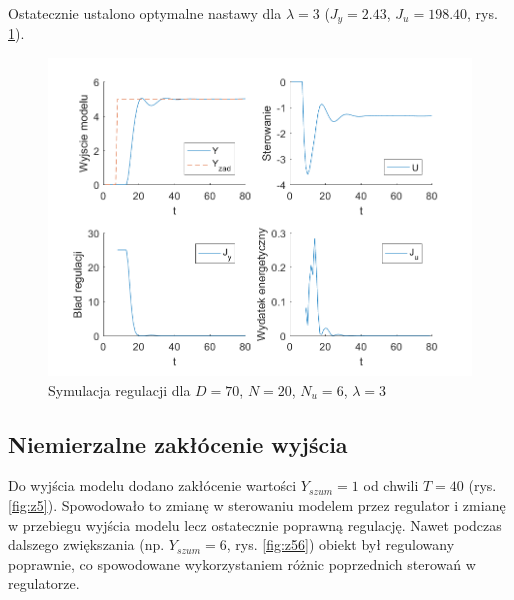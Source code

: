 \documentclass[a4paper, 10pt]{article}
\begin{document}
	Ostatecznie ustalono optymalne nastawy dla $\lambda = 3$ ($J_y=2.43$, $J_u=198.40$, rys. \ref{fig:z4_4}).
	
	\begin{figure}[H]
				\centering
				\includegraphics[width=0.9\linewidth]{z4_70_20_6_3}
				\caption{Symulacja regulacji dla $D=70$, $N=20$, $N_u=6$, $\lambda=3$}
				\label{fig:z4_4}
				\end{figure}
				
	\subsection{Niemierzalne zakłócenie wyjścia}
	Do wyjścia modelu dodano zakłócenie wartości $Y_{szum} = 1$ od chwili $T=40$ (rys. \ref{fig:z5}). Spowodowało to zmianę w sterowaniu modelem przez regulator i zmianę w przebiegu wyjścia modelu lecz ostatecznie poprawną regulację. Nawet podczas dalszego zwiększania (np. $Y_{szum}=6$, rys. \ref{fig:z56}) obiekt był regulowany poprawnie, co spowodowane wykorzystaniem różnic poprzednich sterowań w regulatorze.
	
\end{document}
